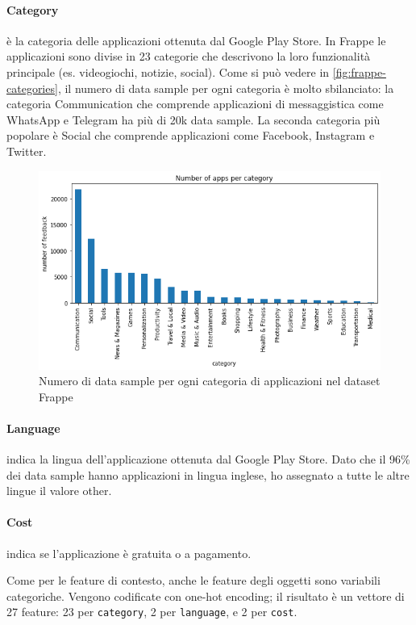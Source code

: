 \documentclass[12pt,italian]{report}
\begin{document}
\paragraph{Category} è la categoria delle applicazioni ottenuta dal Google Play Store. In Frappe le applicazioni sono divise in 23 categorie che descrivono la loro funzionalità principale (es. videogiochi, notizie, social). Come si può vedere in \autoref{fig:frappe-categories}, il numero di data sample per ogni categoria è molto sbilanciato: la categoria Communication che comprende applicazioni di messaggistica come WhatsApp e Telegram ha più di 20k data sample. La seconda categoria più popolare è Social che comprende applicazioni come Facebook, Instagram e Twitter.
\begin{figure}
  \centering
  \includegraphics[width=\linewidth]{immagini/frappe-category.png}
  \caption{Numero di data sample per ogni categoria di applicazioni nel dataset Frappe}
  \label{fig:frappe-categories}
\end{figure}

\paragraph{Language} indica la lingua dell'applicazione ottenuta dal Google Play Store. Dato che il 96\% dei data sample hanno applicazioni in lingua inglese, ho assegnato a tutte le altre lingue il valore other.

\paragraph{Cost} indica se l'applicazione è gratuita o a pagamento.

\bigskip \noindent
Come per le feature di contesto, anche le feature degli oggetti sono variabili categoriche. Vengono codificate con one-hot encoding; il risultato è un vettore di 27 feature: 23 per \texttt{category}, 2 per \texttt{language}, e 2 per \texttt{cost}.
\end{document}
